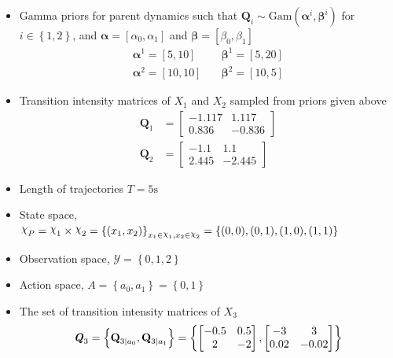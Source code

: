 \begin{itemize}
	\item Gamma priors for parent dynamics such that $ \textbf{Q}_{i} \sim \mathrm{Gam}(\symbf{\alpha}^i, \symbf{\beta}^i)$ for $i \in \left\lbrace 1,2\right\rbrace $, and $ \symbf{\alpha} = [\alpha_0, \alpha_1] $ and $ \symbf{\beta} = [\beta_0, \beta_1] $
	\begin{align}
	\symbf{\alpha}^1 = [5,10] &\quad \symbf{\beta}^1 = [5,20] \\
	\symbf{\alpha}^2 = [10,10] &\quad \symbf{\beta}^2 = [10,5]
	\label{eq:gamma_params}
	\end{align}
	\item Transition intensity matrices of $ X_1 $ and $ X_2 $ sampled from priors given above
	\begin{align}
	\textbf{Q}_1 &= 
	\begin{bmatrix}
	-1.117 & 1.117 \\
	0.836 &  -0.836
	\end{bmatrix} \\
	\textbf{Q}_2 &= 
	\begin{bmatrix}
	-1.1 & 1.1 \\
	2.445 &  -2.445
	\end{bmatrix}
	\end{align}
	\item Length of trajectories $ T = 5\text{s} $
	\item State space, $ \rchi_{P} = \rchi_1 \times \rchi_2 = \left\lbrace (x_1, x_2)\right\rbrace_{x_1\in \rchi_1, x_2\in \rchi_2} = \left\lbrace (0, 0), (0, 1), (1, 0),(1, 1)\right\rbrace $
	\item Observation space, $ \mathcal{Y} = \left\lbrace 0, 1, 2 \right\rbrace $
	\item Action space, $ \textit{A} = \left\lbrace a_{0}, a_{1} \right\rbrace = \left\lbrace 0, 1\right\rbrace $
	\item The set of transition intensity matrices of $ X_3 $
	\begin{align}
	\textbf{\textit{Q}}_3 = \left\lbrace \textbf{Q}_{3\mid a_{0}}, \textbf{Q}_{3\mid a_{1}} \right\rbrace = \left\lbrace 
	\begin{bmatrix}
	-0.5 & 0.5 \\
	2 &  -2
	\end{bmatrix}, 
	\begin{bmatrix}
	-3 & 3 \\
	0.02 &  -0.02
	\end{bmatrix} 
	\right\rbrace 
	\end{align}

\end{itemize}
